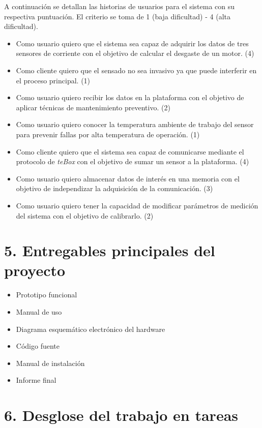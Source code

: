\documentclass[11pt]{charter}
\begin{document}
A continuación se detallan las historias de usuarios para el sistema con su respectiva puntuación. El criterio se toma de 1 (baja dificultad) - 4 (alta dificultad).
\begin{itemize}
\item Como usuario quiero que el sistema sea capaz de adquirir los datos de tres sensores de corriente con el objetivo de calcular el desgaste de un motor. (4)
\item Como cliente quiero que el sensado no sea invasivo ya que puede interferir en el proceso principal. (1)
\item Como usuario quiero recibir los datos en la plataforma con el objetivo de aplicar técnicas de mantenimiento preventivo. (2)
\item Como usuario quiero conocer la temperatura ambiente de trabajo del sensor para prevenir fallas por alta temperatura de operación. (1)
\item Como cliente quiero que el sistema sea capaz de comunicarse mediante el protocolo de \textit{teBox} con el objetivo de sumar un sensor a la plataforma. (4)
\item Como usuario quiero almacenar datos de interés en una memoria con el objetivo de independizar la adquisición de la comunicación. (3)
\item Como usuario quiero tener la capacidad de modificar parámetros de medición del sistema con el objetivo de calibrarlo. (2)
\end{itemize}

\section{5. Entregables principales del proyecto}
\label{sec:entregables}

\begin{itemize}
\item Prototipo funcional
\item Manual de uso
\item Diagrama esquemático electrónico del hardware
\item Código fuente
\item Manual de instalación
\item Informe final

\end{itemize}


\section{6. Desglose del trabajo en tareas}
\label{sec:wbs}
\end{document}
